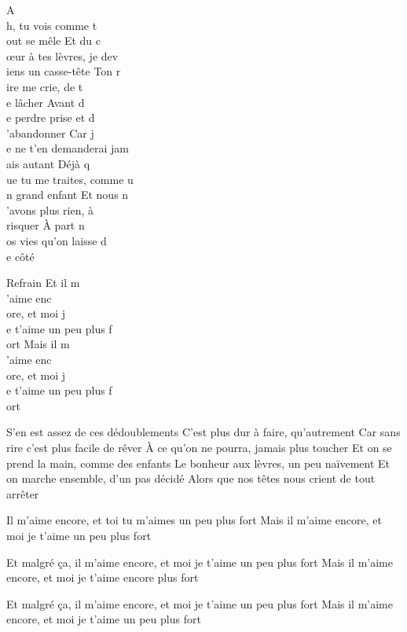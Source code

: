 \beginverse
A\\[Sol]h, tu vois comme t\\[Si7]out se mêle
Et du c\\[Mim]œur à tes lèvres, je dev\\[Do]iens un casse-tête
Ton r\\[Sol]ire me crie, de t\\[Si7]e lâcher
Avant d\\[Mim]e perdre prise et d\\[Do]'abandonner
Car j\\[Sol]e ne t'en demanderai jam\\[Si7]ais autant
Déjà q\\[Mim]ue tu me traites, comme u\\[Do]n grand enfant
Et nous n\\[Sol]'avons plus rien, à\\[Si7] risquer
À part n\\[Mim]os vies qu'on laisse d\\[Do]e côté
\endverse

\beginverse
Refrain
Et il m\\[Do]'aime enc\\[Sol]ore, et moi j\\[Do]e t'aime un peu plus f\\[Sol]ort
Mais il m\\[Do]'aime enc\\[Sol]ore, et moi j\\[Do]e t'aime un peu plus f\\[Sol]ort
\endverse

\beginverse
S'en est assez de ces dédoublements
C'est plus dur à faire, qu'autrement
Car sans rire c'est plus facile de rêver
À ce qu'on ne pourra, jamais plus toucher
Et on se prend la main, comme des enfants
Le bonheur aux lèvres, un peu naïvement
Et on marche ensemble, d'un pas décidé
Alors que nos têtes nous crient de tout arrêter
\endverse

\beginverse
Il m'aime encore, et toi tu m'aimes un peu plus fort
Mais il m'aime encore, et moi je t'aime un peu plus fort
\endverse

\beginverse
Et malgré ça, il m'aime encore, et moi je t'aime un peu plus fort
Mais il m'aime encore, et moi je t'aime encore plus fort
\endverse

\beginverse
Et malgré ça, il m'aime encore, et moi je t'aime un peu plus fort
Mais il m'aime encore, et moi je t'aime un peu plus fort
\\[bis]
\endverse

